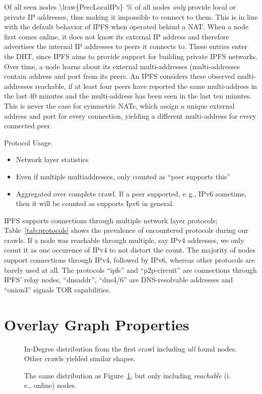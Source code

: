 \documentclass[10pt]{article}
\makeatletter
\newcommand*{\eg}{e.\,g.\@\xspace}
\newcommand*{\ie}{i.\,e.\@\xspace}
\makeatother
\begin{document}
Of all seen nodes \SI{\lraw{PercLocalIPs}}{\percent} of all nodes \emph{only} provide local or private IP addresses, thus making it impossible to connect to them.
This is in line with the default behavior of IPFS when operated behind a NAT.
When a node first comes online, it does not know its external IP address and therefore advertises the internal IP addresses to peers it connects to.
These entries enter the DHT, since IPFS aims to provide support for building private IPFS networks.
Over time, a node learns about its external multi-addresses (multi-addresses contain address and port from its peers.
An IPFS considers these observed multi-addresses reachable, if at least four peers have reported the same multi-address in the last 40 minutes and the multi-address has been seen in the last ten minutes.
This is never the case for symmetric NATs, which assign a unique external address and port for every connection, yielding a different multi-address for every connected peer.
%
\begin{table}[htb]
  \center
  
  \caption{Protocol Usage.}
  \label{tab:protocols}
\end{table}
%
\begin{itemize}
  \item Network layer statistics
  \item Even if multiple multiaddresses, only counted as ``peer supports this''
  \item Aggregated over complete crawl. If a peer supported, \eg, IPv6 sometime, then it will be counted as supports Ipv6 in general.
\end{itemize}
IPFS supports connections through multiple network layer protocols; Table~\ref{tab:protocols} shows the prevalence of encountered protocols during our crawls.
If a node was reachable through multiple, say IPv4 addresses, we only count it as one occurence of IPv4 to not distort the count.
The majority of nodes support connections through IPv4, followed by IPv6, whereas other protocols are barely used at all.
The protocols ``ipfs'' and ``p2p-circuit'' are connections through IPFS' relay nodes, ``dnsaddr'', ``dns4/6'' are DNS-resolvable addresses and ``onion3'' signals TOR capabilities.

\section{Overlay Graph Properties}
\label{sec:graph_properties}
%
\begin{figure}[!htb]
\centering
        
        \caption{In-Degree distribution from the first crawl including \emph{all} found nodes. Other crawls yielded similar shapes.}
        \label{fig:log_all_nodes_degree_distribution}
\end{figure}
\begin{figure}[!htb]
        
        \caption{The same distribution as Figure~\ref{fig:log_all_nodes_degree_distribution}, but only including \emph{reachable} (\ie, online) nodes.}
        \label{fig:log_online_nodes_degree_distribution}
\end{figure}
%
\end{document}
